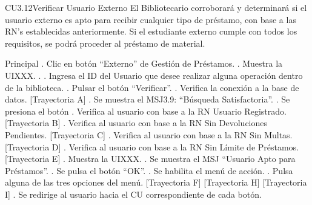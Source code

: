 
	\begin{UseCase}{CU3.12}{Verificar Usuario Externo}{
		El Bibliotecario corroborará y determinará si el usuario externo es apto para recibir cualquier tipo de préstamo, con base a las RN’s establecidas anteriormente. Si el estudiante externo cumple con todos los requisitos, se podrá proceder al préstamo de material.
	}
	\end{UseCase}
	\begin{UCtrayectoria}{Principal}
		.	Clic en botón “Externo” de Gestión de Préstamos.
		.	Muestra la UIXXX. .
		.	Ingresa el ID del Usuario que desee realizar alguna operación dentro de la biblioteca.
		.	Pulsar el botón “Verificar”. 
		.	Verifica la conexión a la base de datos. [Trayectoria A] 
		.	Se muestra el MSJ3.9: “Búsqueda Satisfactoria”.
		. Se presiona el botón 
		.	Verifica al usuario con base a la RN Usuario Registrado. [Trayectoria B]
		.	Verifica al usuario con base a la RN Sin Devoluciones Pendientes. [Trayectoria C]
		.	Verifica al usuario con base a la RN Sin Multas. [Trayectoria D]
		.	Verifica al usuario con base a la RN Sin Límite de Préstamos. [Trayectoria E]
		.	Muestra la UIXXX.
		.	Se muestra el MSJ “Usuario Apto para Préstamos”.
		. Se pulsa el botón “OK”. 
		. Se habilita el menú de acción.
		. Pulsa alguna de las tres opciones del menú. [Trayectoria F] [Trayectoria H] [Trayectoria I]
		. Se redirige al usuario hacia el CU correspondiente de cada botón.
 
	\end{UCtrayectoria}



